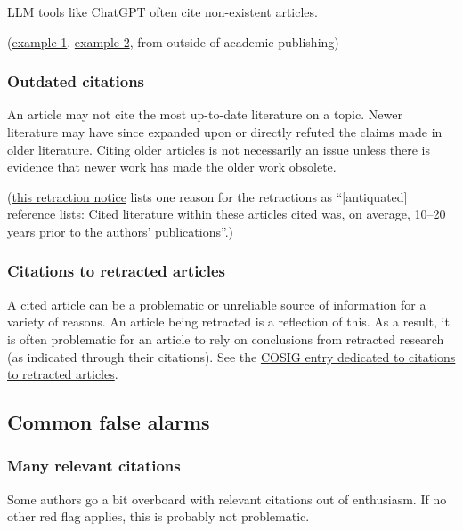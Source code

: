 \documentclass[letterpaper, 12pt]{article}
\begin{document}
LLM tools like ChatGPT often cite non-existent articles.

(\href{https://pubpeer.com/publications/8D6BF963665181144EC553BE2FDA92\#2}{example 1},
\href{https://web.archive.org/web/20230623093222/https://www.theguardian.com/technology/2023/jun/23/two-us-lawyers-fined-submitting-fake-court-citations-chatgpt}{example 2}, from outside of academic publishing)

\subsubsection*{Outdated citations}

An article may not cite the most up-to-date literature on a topic. Newer literature may have since expanded upon or directly refuted the claims made in older literature. Citing older articles is not necessarily an issue unless there is evidence that newer work has made the older work obsolete.

(\href{https://doi.org/10.1177/00315125241311636}{this retraction notice} lists one reason for the retractions as ``[antiquated] reference lists: Cited literature within these articles cited was, on average, 10–20 years prior to the authors’ publications''.)

\subsubsection*{Citations to retracted articles}

A cited article can be a problematic or unreliable source of information for a variety of reasons. An article being retracted is a reflection of this. As a result, it is often problematic for an article to rely on conclusions from retracted research (as indicated through their citations). See the \href{https://osf.io/9q3as}{COSIG entry dedicated to citations to retracted articles}.

\subsection*{Common false alarms}

\subsubsection*{Many relevant citations}

Some authors go a bit overboard with
relevant citations out of enthusiasm. If no other red flag applies,
this is probably not problematic.
\end{document}
